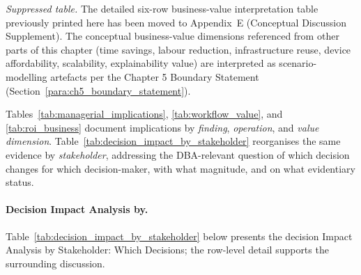 \label{tab:roi_business}

\noindent\textit{Suppressed table.} The detailed six-row business-value interpretation table previously printed here has been moved to Appendix~E (Conceptual Discussion Supplement). The conceptual business-value dimensions referenced from other parts of this chapter (time savings, labour reduction, infrastructure reuse, device affordability, scalability, explainability value) are interpreted as scenario-modelling artefacts per the Chapter 5 Boundary Statement (Section~\ref{para:ch5_boundary_statement}).

\noindent Tables~\ref{tab:managerial_implications}, \ref{tab:workflow_value}, and \ref{tab:roi_business} document implications by \emph{finding}, \emph{operation}, and \emph{value dimension}. Table~\ref{tab:decision_impact_by_stakeholder} reorganises the same evidence by \emph{stakeholder}, addressing the DBA-relevant question of which decision changes for which decision-maker, with what magnitude, and on what evidentiary status.

\paragraph{Decision Impact Analysis by.}


\noindent Table~\ref{tab:decision_impact_by_stakeholder} below presents the decision Impact Analysis by Stakeholder: Which Decisions; the row-level detail supports the surrounding discussion.

